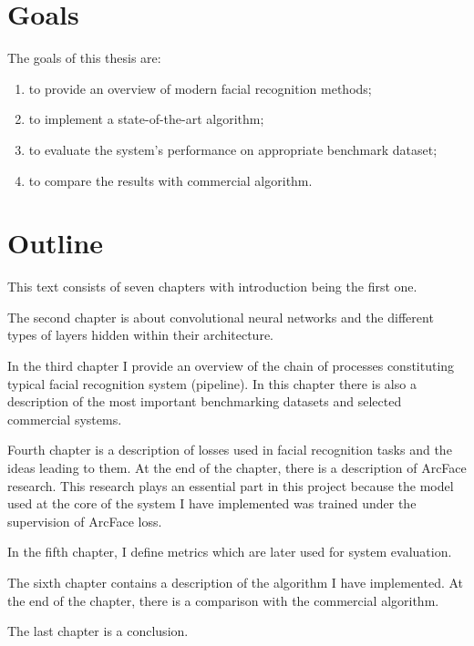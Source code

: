 \section{Goals}\label{sec:goals}
The goals of this thesis are:
\begin{enumerate}
    \item to provide an overview of modern facial recognition methods;
    \item to implement a state-of-the-art algorithm;
    \item to evaluate the system's performance on appropriate benchmark dataset;
    \item to compare the results with commercial algorithm.
\end{enumerate}

\section{Outline}\label{sec:outline}
This text consists of seven chapters with introduction being the first one.

The second chapter is about convolutional neural networks and the different types of layers hidden within their
architecture.

In the third chapter I provide an overview of the chain of processes constituting typical facial recognition system
(pipeline).
In this chapter there is also a description of the most important benchmarking datasets and selected commercial
systems.

Fourth chapter is a description of losses used in facial recognition tasks and the ideas leading to them.
At the end of the chapter, there is a description of ArcFace research.
This research plays an essential part in this project because the model used at the core of the system I have
implemented was trained under the supervision of ArcFace loss.

In the fifth chapter, I define metrics which are later used for system evaluation.

The sixth chapter contains a description of the algorithm I have implemented.
At the end of the chapter, there is a comparison with the commercial algorithm.

The last chapter is a conclusion.